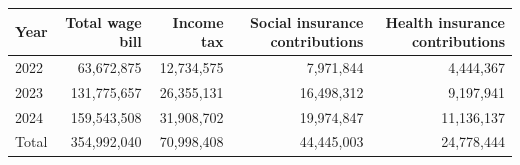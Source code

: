 
\begin{tabular}{lrrrr}
\toprule
Year & Total wage bill & Income tax & Social insurance contributions & Health insurance contributions\\
\midrule
2022 & 63,672,875 & 12,734,575 & 7,971,844 & 4,444,367\\
2023 & 131,775,657 & 26,355,131 & 16,498,312 & 9,197,941\\
2024 & 159,543,508 & 31,908,702 & 19,974,847 & 11,136,137\\
Total & 354,992,040 & 70,998,408 & 44,445,003 & 24,778,444\\
\bottomrule
\end{tabular}
